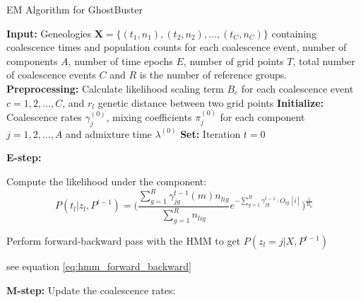 \begin{algorithm}
\caption{EM Algorithm for GhostBuster}
\begin{algorithmic}[1]
\State \textbf{Input:} Geneologies $\mathbf{X} = \{(t_1,n_1), (t_2,n_2), \dots, (t_C,n_C)\}$ containing coalescence times and population counts for each coalescence event, number of components $A$, number of time epochs $E$, number of grid points $T$, total number of coalescence events $C$ and $R$ is the number of reference groups.
\State \textbf{Preprocessing:} Calculate likelihood scaling term $B_c$ for each coalescence event $c = 1, 2, \dots, C$, and $r_l$ genetic distance between two grid points
\State \textbf{Initialize:} Coalescence rates $\gamma_j^{(0)}$, mixing coefficients $\pi_j^{(0)}$ for each component $j = 1, 2, \dots, A$ and admixture time $\lambda^{(0)}$ 
\State \textbf{Set:} Iteration $t = 0$

\Repeat

    \State \textbf{E-step:} 
    

    
            
            

            \vspace{2mm}
            
            \State Compute the likelihood under the component:
            \[
               P(t_l \vert z_l, P^{t-1}) =  \Big( \frac{\sum_{g=1}^R\gamma^{t-1}_{jg}(m)n_{lig}}{\sum_{g=1}^R n_{lig}}e^{-\sum_{g=1}^R \gamma^{t-1}_{jg} \cdot O_{lg}[i]} \Big)^{\frac{1}{B_{li}}}
            \]
        \EndFor
        
        \State Perform forward-backward pass with the HMM to get $P(z_l = j | X, P^{t-1})$ 

        \hspace{7mm} see equation \ref{eq:hmm_forward_backward}

        
    \EndFor
    
    \State \textbf{M-step:}
        \State Update the coalescence rates:
        

\end{algorithmic}
\end{algorithm}
